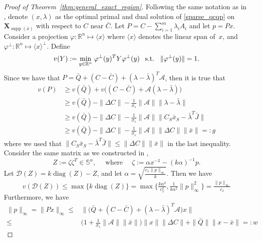 \documentclass[10pt,a4paper]{amsart}
\newcommand{\RR}{\mathbb{R}}
\renewcommand{\SS}{{\mathbb{S}}}
\newcommand{\cA}{{\mathcal{A}}}
\newcommand{\cD}{{\mathcal{D}}}
\DeclareMathOperator{\diag}{diag}
\newcommand{\st}{\text{\, s.t.\, }}
\DeclareMathOperator{\supp}{supp}
\newcommand{\vX}{{\mathbf{X}}}
\begin{document}
	\begin{proof}[Proof of Theorem~\ref{thm:general_exact_region}]
		Following the same notation as in , denote $(x, \lambda)$ as the optimal primal and dual solution of \eqref{sparse_qcqp} on \(\vX_{\supp (\bar x)}\) with respect to  \(C\) near \(\bar C\). Let $P = C - \sum_{i=1}^m\lambda_iA_i$
		and let $ p =  P x$.
		Consider a projection $\varphi: \RR^n \mapsto \langle  x\rangle$ where $\langle x\rangle$ denotes the linear span of~$x$, and $\varphi^\perp: \RR^n \mapsto \langle x\rangle^\perp$.
		Define 
		\[v(Y) := \underset{y \in \RR^n}{\min} \;\varphi^\perp(y)^T Y \varphi^\perp(y) \;\st\; \|\varphi^\perp(y)\|=1 .
		\]
		Since we have that $P = \bar Q + (C - \bar C) + (\lambda - \bar \lambda)^T \cA$, then it is true that
		\begin{equation}\label{eq:exact_region_ineq1}
			\begin{split}
				v(P) &\geq v(\bar Q) + v\big(( C - \bar C) + \cA(\lambda - \bar \lambda)\big)\\
				&\geq v(\bar Q) - \|\Delta C\| - \frac{1}{\sigma_s}\|\cA\|\|\lambda - \bar\lambda\|\\
				&\geq v(\bar Q) - \|\Delta C\| - \frac{1}{\sigma_s}\|\cA\|\| C_S\bar x_S - \bar\lambda^T\bar J\| \\
				&\geq v(\bar Q) - \|\Delta C\| - \frac{1}{\sigma_s}\|\cA\|\| \Delta C\|\|\bar x \|=:  g
			\end{split}
		\end{equation}
		where we used that \(\| C_S\bar x_S - \bar\lambda^T\bar J\|\leq \|\Delta C\|\|\bar x \|\) in the last inequality.
		Consider the same matrix as we constructed in ,
		\begin{equation}
			Z := \zeta\zeta^T \in \SS^n,
			\quad\text{ where }\quad
			\zeta := \alpha x^{-1}  - (k\alpha)^{-1} p.
		\end{equation}
		Let $\cD(Z) = k\diag(Z) - Z$, and let $\alpha = \sqrt{\frac{c_{ x} \|p\|_\infty}{k}}$.
		Then we have
		\begin{equation}\label{eq:exact_region_ineq2}
			v(\cD (Z)) \leq \max\{k\diag(Z)\} = \max\{\tfrac{k\alpha^2}{c^2_{x}}, \tfrac{1}{k\alpha^2} \| p\|^2_\infty\} = \tfrac{\|p\|_\infty}{c_x}
		\end{equation}
		Furthermore, we have
		\begin{equation}\label{eq:exact_region_ineq3}
			\begin{split}
				\| p\|_\infty =  \|P x\|_\infty
				\leq & \Big\|\big(\bar Q + (C - \bar C) + (\lambda - \bar\lambda)^T \cA\big)x\Big\|\\
				\leq & \big(1 +\frac{1}{\sigma_s}\|\cA\|\|\bar x\|\big)\| x\|\|\Delta C\|
				+\|\bar Q\|\| x- \bar x\| =:  w
			\end{split}
		\end{equation}
        

\end{proof}
\end{document}
